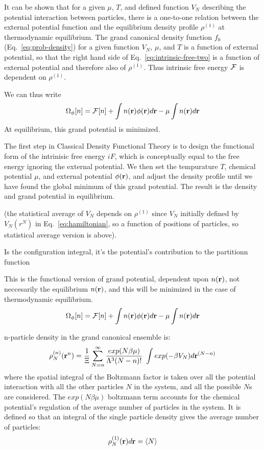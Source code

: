 It can be shown that for a given $\mu$, $T$, and defined function
$V_N$ describing the potential interaction between particles, there is
a one-to-one relation between the external potential function and the
equilibrium density profile $\rho^{(1)}$ at thermodynamic equilibrium.
The grand canonical density function $f_0$ (Eq.~\ref{eq:prob-density})
for a given function $V_N$, $\mu$, and $T$ is a function of external
potential, so that the right hand side of
Eq.~\ref{eq:intrinsic-free-two} is a function of external potential
and therefore also of $\rho^{(1)}$.  Thus intrinsic free energy $\mathcal{F}$
is dependent on $\rho^{(1)}$.


We can thus write
\begin{align}
  \Omega_{\phi}[n] = \mathcal{F}[n] + \int n(\textbf{r})\phi(\textbf{r})d\textbf{r} - \mu\int n(\textbf{r})d\textbf{r}
\end{align}
At equilibrium, this grand potential is minimized.


The first step in Classical Density Functional Theory is to design the
functional form of the intrinisic free energy $iF$, which is
conceptually equal to the free energy ignoring the external potential.
We then set the tempurature $T$, chemical potential $\mu$, and
external potential $\phi(\textbf{r})$, and adjust the density profile until
we have found the global minimum of this grand potential.  The result
is the density and grand potential in equilibrium.


(the statistical average of $V_N$
depends on $\rho^{(1)}$ since $V_N$ initially defined by $V_N(r^N)$ in
Eq.~\ref{eq:hamiltonian}, so a function of positions of particles, so
statistical average version is above).

Is the configuration integral, it's the potential's contribution to the partitionn function

This is the functional version of grand potential, dependent upon
$n(\textbf{r})$, not neccesarily the equilibrium $n(\textbf{r})$, and this will be
minimized in the case of thermodynamic equilibrium.
\begin{align}
  \Omega_{\phi}[n] = \mathcal{F}[n] + \int n(\textbf{r})\phi(\textbf{r})d\textbf{r} - \mu\int n(\textbf{r})d\textbf{r}
\end{align}


n-particle density in the grand canonical ensemble is:
\begin{align}
  \rho_N^{(n)}(\textbf{r}^n)=\frac{1}{\Xi}\sum^{\infty}_{N=n}\frac{exp(N\beta \mu)}{\Lambda^3 (N-n)!} \
  \int exp(-\beta V_N)d\textbf{r}^{(N-n)}
\end{align}
where the spatial integral of the Boltzmann factor is taken over all
the potential interaction with all the other particles $N$ in the
system, and all the possible $N$s are considered. The $exp(N\beta
\mu)$ boltzmann term accounts for the chemical potential's regulation
of the average number of particles in the system.  It is defined so
that an integral of the single particle density gives the average
number of particles:
\begin{align}
  \rho_N^{(1)}(\textbf{r})d\textbf{r} = \langle N \rangle
\end{align}



